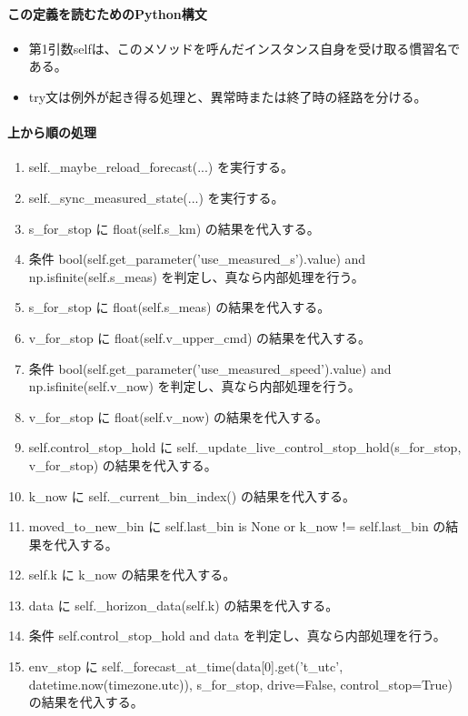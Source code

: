 \documentclass[a4paper,11pt]{article}
\begin{document}
            \paragraph{この定義を読むためのPython構文}
            \begin{itemize}[leftmargin=1.6em]
            \item 第1引数selfは、このメソッドを呼んだインスタンス自身を受け取る慣習名である。
\item try文は例外が起き得る処理と、異常時または終了時の経路を分ける。
            \end{itemize}
            \paragraph{上から順の処理}
            \begin{enumerate}[leftmargin=1.8em]
            \item self.\_maybe\_reload\_forecast(...) を実行する。
\item self.\_sync\_measured\_state(...) を実行する。
\item s\_for\_stop に float(self.s\_km) の結果を代入する。
\item 条件 bool(self.get\_parameter('use\_measured\_s').value) and np.isfinite(self.s\_meas) を判定し、真なら内部処理を行う。
\item   s\_for\_stop に float(self.s\_meas) の結果を代入する。
\item v\_for\_stop に float(self.v\_upper\_cmd) の結果を代入する。
\item 条件 bool(self.get\_parameter('use\_measured\_speed').value) and np.isfinite(self.v\_now) を判定し、真なら内部処理を行う。
\item   v\_for\_stop に float(self.v\_now) の結果を代入する。
\item self.control\_stop\_hold に self.\_update\_live\_control\_stop\_hold(s\_for\_stop, v\_for\_stop) の結果を代入する。
\item k\_now に self.\_current\_bin\_index() の結果を代入する。
\item moved\_to\_new\_bin に self.last\_bin is None or k\_now != self.last\_bin の結果を代入する。
\item self.k に k\_now の結果を代入する。
\item data に self.\_horizon\_data(self.k) の結果を代入する。
\item 条件 self.control\_stop\_hold and data を判定し、真なら内部処理を行う。
\item   env\_stop に self.\_forecast\_at\_time(data[0].get('t\_utc', datetime.now(timezone.utc)), s\_for\_stop, drive=False, control\_stop=True) の結果を代入する。

\end{enumerate}
\end{document}
